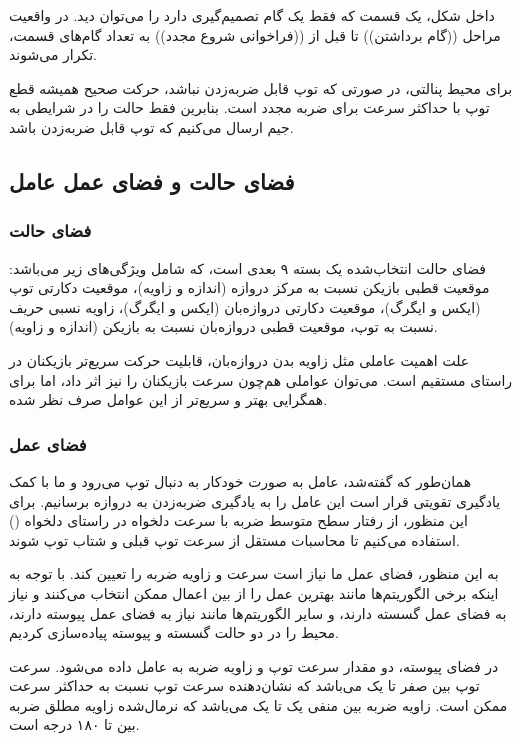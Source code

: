 داخل شکل، یک قسمت که فقط یک گام تصمیم‌گیری دارد را می‌توان دید. در واقعیت مراحل ((گام برداشتن))
تا قبل از ((فراخوانی شروع مجدد))
به تعداد گام‌های قسمت، تکرار می‌شوند.

برای محیط پنالتی، در صورتی که توپ قابل ضربه‌زدن نباشد، حرکت صحیح همیشه قطع توپ با حداکثر سرعت برای ضربه مجدد است. بنابرین فقط حالت را در شرایطی به جیم ارسال می‌کنیم که توپ قابل ضربه‌زدن باشد.
\subsection{فضای حالت و فضای عمل عامل}
\subsubsection{فضای حالت}
فضای حالت انتخاب‌شده یک بسته ۹ بعدی است، که شامل ویژگی‌های زیر می‌باشد: موقعیت قطبی بازیکن نسبت به مرکز دروازه (اندازه و زاویه)،
موقعیت دکارتی توپ‌ (ایکس و ایگرگ)،
موقعیت دکارتی دروازه‌بان (ایکس و ایگرگ)،
زاویه نسبی حریف نسبت به توپ،
موقعیت قطبی دروازه‌بان نسبت به بازیکن (اندازه و زاویه).

علت اهمیت عاملی مثل زاویه بدن دروازه‌بان، قابلیت حرکت سریع‌تر بازیکنان در راستای مستقیم است. می‌توان عواملی هم‌چون سرعت بازیکنان را نیز اثر داد،
اما برای همگرایی بهتر و سریع‌تر از این عوامل صرف نظر شده.
\subsubsection{فضای عمل}
همان‌طور که گفته‌شد، عامل به صورت خودکار به دنبال توپ می‌رود و ما با کمک یادگیری تقویتی قرار است این عامل را به یادگیری ضربه‌زدن به دروازه برسانیم.
برای این منظور، از رفتار سطح متوسط ضربه با سرعت دلخواه در راستای دلخواه ()
 استفاده می‌کنیم تا محاسبات مستقل از سرعت توپ قبلی و شتاب توپ شوند.

 به این منظور، فضای عمل ما نیاز است سرعت و زاویه ضربه را تعیین کند.
 با توجه به اینکه برخی الگوریتم‌ها مانند  بهترین عمل را از بین اعمال ممکن انتخاب می‌کنند و نیاز به فضای عمل گسسته دارند،
و سایر الگوریتم‌ها مانند  نیاز به فضای عمل پیوسته دارند،
محیط را در دو حالت گسسته و پیوسته پیاده‌سازی کردیم.

در فضای پیوسته، دو مقدار سرعت توپ و زاویه ضربه به عامل داده می‌شود.
سرعت توپ بین صفر تا یک می‌باشد که نشان‌دهنده سرعت توپ نسبت به حداکثر سرعت ممکن است.
زاویه ضربه بین منفی یک تا یک می‌باشد که نرمال‌شده زاویه مطلق ضربه بین  تا ۱۸۰ درجه است.

